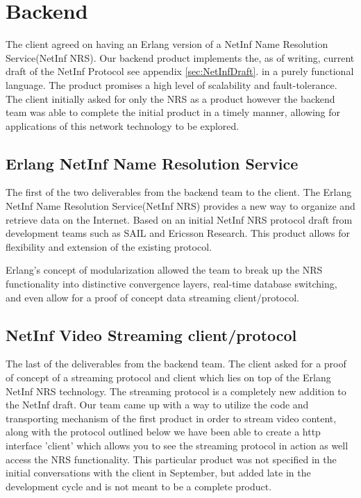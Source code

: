 \section {Backend}

The client agreed on having an Erlang version of a NetInf Name Resolution Service(NetInf NRS).  Our backend product implements the, as of writing, current draft of the NetInf Protocol see appendix  \ref{sec:NetInfDraft}.  in a purely functional language. The product promises a high level of scalability and fault-tolerance. The client initially asked for only the NRS as a product however the backend team was able to complete the initial product in a timely manner, allowing for applications of this network technology to be explored. 


\subsection {Erlang NetInf Name Resolution Service}
The first of the two deliverables from the backend team to the client. The Erlang NetInf Name Resolution Service(NetInf NRS) provides a new way to organize and retrieve data on the Internet. Based on an initial NetInf NRS protocol draft from development teams such as SAIL and Ericsson Research. This product allows for flexibility and extension of the existing protocol.

Erlang's concept of modularization allowed the team to break up the NRS functionality into distinctive convergence layers, real-time database switching, and even allow for a proof of concept data streaming client/protocol. 

\subsection{NetInf Video Streaming client/protocol}

The last of the deliverables from the backend team. The client asked for a proof of concept of a streaming protocol and client which lies on top of the Erlang NetInf NRS technology. The streaming protocol is a completely new addition to the NetInf draft. Our team came up with a way to utilize the code and transporting mechanism of the first product in order to stream video content, along with the protocol outlined below we have been able to create a http interface 'client' which allows you to see the streaming protocol in action as well access the NRS functionality. This particular product was not specified in the initial conversations with the client in September, but added late in the development cycle and is not meant to be a complete product.

